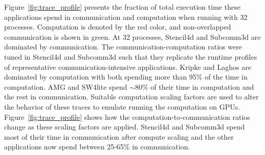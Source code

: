 Figure~\ref{fig:trace_profile} presents the fraction of total execution
time these applications spend in communication and computation when running
with 32 processes.  Computation is denoted by the red color, and non-overlapped
communication is shown in green. At 32 processes, Stencil4d and Subcomm3d are
dominated by communication. The communication-computation ratios were tuned in
Stencil4d and Subcomm3d such that they replicate the runtime profiles of
representative communication-intensive applications.  Kripke and Laghos are
dominated by computation with both spending more than 95\% of the time in computation.
AMG and SW4lite spend $\sim$80\% of their time in computation and the rest in
communication.  Suitable
computation scaling factors are used to alter the behavior of these traces to
emulate running the computation on GPUs. Figure~\ref{fig:trace_profile} 
shows how the computation-to-communication ratios change as these
scaling factors are applied. Stencil4d and Subcomm3d spend most of their time in
communication after compute scaling and the other applications now spend
between 25-65\% in communication.

